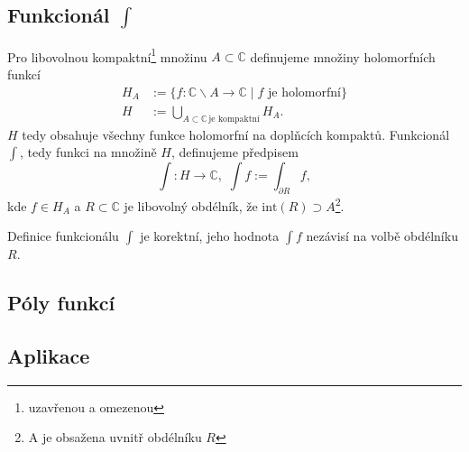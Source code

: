 \documentclass[../main.tex]{subfiles}
\begin{document}
\subsection{Funkcionál $\int$}

\begin{definition}[Funkcionál]
    Pro libovolnou kompaktní\footnote{uzavřenou a omezenou} množinu $A\subset\mathbb{C}$
    definujeme množiny holomorfních funkcí 
    \begin{align*}
        H_A &:= \{ f: \mathbb{C}\backslash A \to \mathbb{C} \mid f \,\,\text{je holomorfní} \}\\
        H &:= \bigcup_{A\subset\mathbb{C}\,\text{je kompaktní}} H_A.
    \end{align*}
    $H$ tedy obsahuje všechny funkce holomorfní na doplňcích kompaktů.
    Funkcionál $\int$, tedy funkci na množině $H$, definujeme předpisem
    \[ \int : H \to \mathbb{C}, \,\, \int f := \int_{\partial R}f, \]
    kde $f\in H_A$ a $R\subset\mathbb{C}$ je libovolný obdélník, že $\text{int}(R) \supset A$\footnote{A je obsažena uvnitř obdélníku $R$}.
\end{definition}

\begin{lemma}
    Definice funkcionálu $\int$ je korektní, jeho hodnota $\int f$ nezávisí na volbě obdélníku $R$.
\end{lemma}

\subsection{Póly funkcí}
\subsection{Aplikace}
\end{document}
